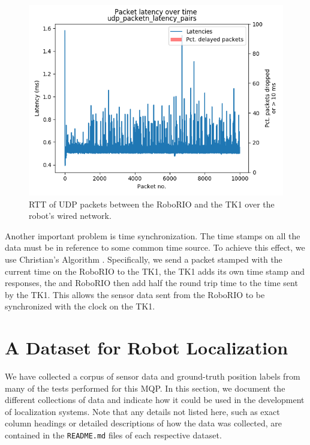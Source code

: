 \documentclass{article}
\begin{document}
		\begin{figure}[H]
			\centering
			\includegraphics[width=0.7\linewidth]{./images/rio_tk1_udp_latency_timeseries.png}
			\caption{RTT of UDP packets between the RoboRIO and the TK1 over the robot's wired network.}
			\label{fig:udp_timing}
		\end{figure}

		Another important problem is time synchronization. The time stamps on all the data must be in reference to some common time source. To achieve this effect, we use Christian's Algorithm \cite{cristian_probabilistic_1989}. Specifically, we send a packet stamped with the current time on the RoboRIO to the TK1, the TK1 adds its own time stamp and responses, the and RoboRIO then add half the round trip time to the time sent by the TK1. This allows the sensor data sent from the RoboRIO to be synchronized with the clock on the TK1.




\section{A Dataset for Robot Localization} \label{section:dataset}

  We have collected a corpus of sensor data and ground-truth position labels from many of the tests performed for this MQP. In this section, we document the different collections of data and indicate how it could be used in the development of localization systems. Note that any details not listed here, such as exact column headings or detailed descriptions of how the data was collected, are contained in the \texttt{README.md} files of each respective dataset.
\end{document}

